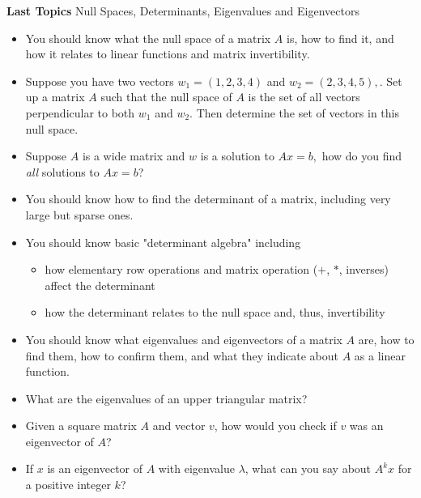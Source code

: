 \documentclass[11pt,fleqn]{article}
\begin{document}
\noindent\textbf{Last Topics} Null Spaces, Determinants, Eigenvalues and Eigenvectors\\

	\begin{itemize}
	\item You should know what the null space of a matrix $A$ is, how to find it, and how it relates to linear functions and matrix invertibility.
	\item Suppose you have two vectors $w_1=(1,2,3,4)$ and $w_2=(2,3,4,5),$. Set up a matrix $A$ such that the null space of $A$ is the set of all vectors perpendicular to both $w_1$ and $w_2.$ Then determine the set of vectors in this null space.
	\item Suppose $A$ is a wide matrix and $w$ is a solution to $Ax=b,$ how do you find \emph{all} solutions to $Ax=b$?
	\item You should know how to find the determinant of a matrix, including very large but sparse ones. 
	\item You should know basic "determinant algebra" including
		\begin{itemize}
		\item how elementary row operations and matrix operation ($+$, $*$, inverses) affect the determinant
		\item how the determinant relates to the null space and, thus, invertibility
		\end{itemize}
	\item You should know what eigenvalues and eigenvectors of a matrix $A$ are, how to find them, how to confirm them, and what they indicate about $A$ as a linear function.
	\item What are the eigenvalues of an upper triangular matrix? 
	\item Given a square matrix $A$ and vector $v$, how would you check if $v$ was an eigenvector of $A$? 
	\item If $x$ is an eigenvector of $A$ with eigenvalue $\lambda$, what can you say about $A^kx$ for a positive integer $k$?
	\end{itemize}
\end{document}

